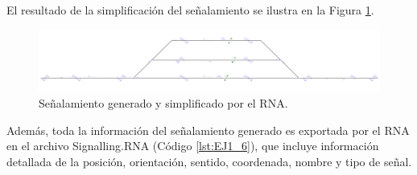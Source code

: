 	El resultado de la simplificación del señalamiento se ilustra en la Figura \ref{fig:EJ9_7}.
	
	\begin{figure}[H]
		\centering
		\includegraphics[width=1\textwidth]{resultados-obtenidos/ejemplo9/images/9_RNA.png}
		\centering\caption{Señalamiento generado y simplificado por el RNA.}
		\label{fig:EJ9_7}
	\end{figure}
	
	Además, toda la información del señalamiento generado es exportada por el RNA en el archivo Signalling.RNA (Código \ref{lst:EJ1_6}), que incluye información detallada de la posición, orientación, sentido, coordenada, nombre y tipo de señal.
	
